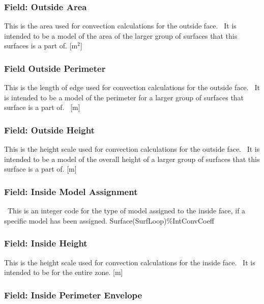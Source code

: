 \subsubsection{Field: Outside Area}\label{field-outside-area}

This is the area used for convection calculations for the outside face.~ It is intended to be a model of the area of the larger group of surfaces that this surfaces is a part of. {[}m\(^{2}\){]}

\subsubsection{Field Outside Perimeter}\label{field-outside-perimeter}

This is the length of edge used for convection calculations for the outside face.~ It is intended to be a model of the perimeter for a larger group of surfaces that surface is a part of.~ {[}m{]}

\subsubsection{Field: Outside Height}\label{field-outside-height}

This is the height scale used for convection calculations for the outside face.~ It is intended to be a model of the overall height of a larger group of surfaces that this surface is a part of. {[}m{]}

\subsubsection{Field: Inside Model Assignment}\label{field-inside-model-assignment}

~This is an integer code for the type of model assigned to the inside face, if a specific model has been assigned. Surface(SurfLoop)\%IntConvCoeff

\subsubsection{Field: Inside Height}\label{field-inside-height}

This is the height scale used for convection calculations for the inside face.~ It is intended to be for the entire zone. {[}m{]}

\subsubsection{Field: Inside Perimeter Envelope}\label{field-inside-perimeter-envelope}

